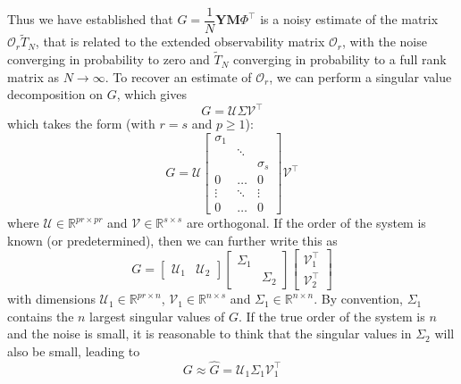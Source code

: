 \documentclass[11pt]{report} %
\begin{document}
Thus we have established that $G = \dfrac{1}{N}\mathbf{Y}\mathbf{M}\Phi^{\top}$ is a noisy estimate of the matrix $\mathcal{O}_{r}\widetilde{T}_{N}$, that is related to the extended observability matrix $\mathcal{O}_{r}$, with the noise converging in probability to zero and $\widetilde{T}_{N}$ converging in probability to a full rank matrix as $N \to \infty$. To recover an estimate of $\mathcal{O}_{r}$, we can perform a singular value decomposition on $G$, which gives
\begin{equation}
G = \mathcal{U}\Sigma\mathcal{V}^{\top}
\end{equation}
which takes the form (with $r = s$ and $p \geq 1$):
\begin{equation}
G = \mathcal{U}\begin{bmatrix}\sigma_{1}\\
 & \ddots\\
 &  & \sigma_{s}\\
0 & \dots & 0\\
\vdots & \ddots & \vdots\\
0 & \dots & 0
\end{bmatrix}\mathcal{V}^{\top}
\end{equation}
where $\mathcal{U} \in \mathbb{R}^{pr \times pr}$ and $\mathcal{V} \in \mathbb{R}^{s \times s}$ are orthogonal. If the order of the system is known (or predetermined), then we can further write this as
\begin{equation}
G = \begin{bmatrix}\mathcal{U}_{1} & \mathcal{U}_{2} \end{bmatrix}\begin{bmatrix}
\Sigma_{1} & \\ & \Sigma_{2}
\end{bmatrix}\begin{bmatrix}
\mathcal{V}_{1}^{\top} \\ \mathcal{V}_{2}^{\top}
\end{bmatrix}
\end{equation}
with dimensions $\mathcal{U}_{1} \in \mathbb{R}^{pr \times n}$, $\mathcal{V}_{1} \in \mathbb{R}^{n \times s}$ and $\Sigma_{1} \in \mathbb{R}^{n \times n}$. By convention, $\Sigma_{1}$ contains the $n$ largest singular values of $G$. If the true order of the system is $n$ and the noise is small, it is reasonable to think that the singular values in $\Sigma_{2}$ will also be small, leading to
\begin{equation}
G \approx \widehat{G} = \mathcal{U}_{1}\Sigma_{1}\mathcal{V}_{1}^{\top}
\end{equation}
\end{document}
